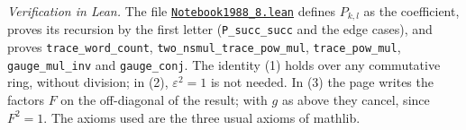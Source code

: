 \emph{Verification in Lean.} The file \href{\leanblobmain/Notebook1988_8.lean}{\texttt{Notebook1988\_8.\allowbreak{}lean}} defines $P_{k,l}$ as the coefficient, proves its recursion by the first letter (\texttt{P\_succ\_succ} and the edge cases), and proves \texttt{trace\_word\_count}, \texttt{two\_nsmul\_trace\_pow\_mul}, \texttt{trace\_pow\_mul}, \texttt{gauge\_mul\_inv} and \texttt{gauge\_conj}. The identity (1) holds over any commutative ring, without division; in (2), $\varepsilon^2 = 1$ is not needed. In (3) the page writes the factors $F$ on the off-diagonal of the result; with $g$ as above they cancel, since $F^2 = 1$. The axioms used are the three usual axioms of mathlib.

